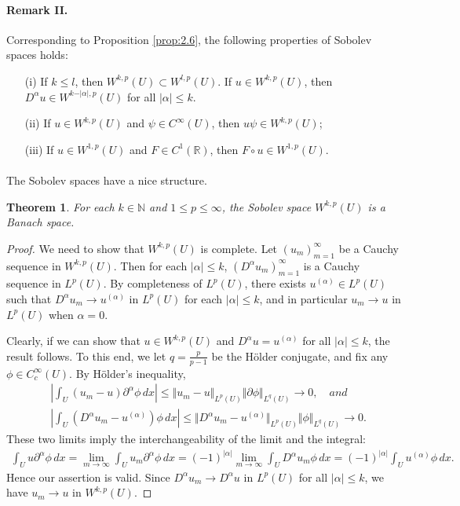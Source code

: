 \documentclass{article}
\numberwithin{equation}{section}
\newcommand{\bbN}{\mathbb{N}}
\newcommand{\bbR}{\mathbb{R}}
\theoremstyle{plain}
\newtheorem{theorem}{Theorem}[section]
\theoremstyle{definition}
\begin{document}
\paragraph{Remark II.} Corresponding to Proposition \ref{prop:2.6}, the following properties of Sobolev spaces holds:
\begin{itemize}
	\item[(i)] If $k\leq l$, then $W^{k,p}(U)\subset W^{l,p}(U)$. If $u\in W^{k,p}(U)$, then $D^\alpha u\in W^{k-\vert\alpha\vert,p}(U)$ for all $\vert\alpha\vert\leq k$.
	\item[(ii)] If $u\in W^{k,p}(U)$ and $\psi\in C^\infty(U)$, then $u\psi\in W^{k,p}(U)$;
	\item[(iii)] If $u\in W^{1,p}(U)$ and $F\in C^1(\bbR)$, then $F\circ u\in W^{1,p}(U)$.
\end{itemize}

\paragraph{} The Sobolev spaces have a nice structure.

\begin{theorem}
For each $k\in\bbN$ and $1\leq p\leq\infty$, the Sobolev space $W^{k,p}(U)$ is a Banach space.
\end{theorem}
\begin{proof}
We need to show that $W^{k,p}(U)$ is complete. Let $(u_m)_{m=1}^\infty$ be a Cauchy sequence in $W^{k,p}(U)$. Then for each $\vert\alpha\vert\leq k$, $(D^\alpha u_m)_{m=1}^\infty$ is a Cauchy sequence in $L^p(U)$. By completeness of $L^p(U)$, there exists $u^{(\alpha)}\in L^p(U)$ such that $D^\alpha u_m\to u^{(\alpha)}$ in $L^p(U)$ for each $\vert\alpha\vert\leq k$, and in particular $u_m\to u$ in $L^p(U)$ when $\alpha=0$.

Clearly, if we can show that $u\in W^{k,p}(U)$ and $D^\alpha u=u^{(\alpha)}$ for all $\vert\alpha\vert\leq k$, the result follows. To this end, we let $q=\frac{p}{p-1}$ be the Hölder conjugate, and fix any $\phi\in C_c^\infty(U)$. By Hölder's inequality,
\begin{align}
	&\left\vert\int_U (u_m-u)\partial^\alpha\phi\,dx\right\vert\leq\Vert u_m-u\Vert_{L^p(U)}\Vert\partial\phi\Vert_{L^q(U)}\to 0,\quad and\\
	&\left\vert\int_U (D^\alpha u_m-u^{(\alpha)})\phi\,dx\right\vert\leq\Vert D^\alpha u_m-u^{(\alpha)}\Vert_{L^p(U)}\Vert\phi\Vert_{L^q(U)}\to 0.\label{convinterwd}
\end{align} 
These two limits imply the interchangeability of the limit and the integral:
\begin{align*}
	\int_U u\partial^\alpha\phi\,dx=\lim_{m\to\infty}\int_U u_m\partial^\alpha\phi\,dx=(-1)^{\vert\alpha\vert}\lim_{m\to\infty}\int_U D^\alpha u_m\phi\,dx=(-1)^{\vert\alpha\vert}\int_U u^{(\alpha)}\phi\,dx.
\end{align*}
Hence our assertion is valid. Since $D^\alpha u_m\to D^\alpha u$ in $L^p(U)$ for all $\vert\alpha\vert\leq k$, we have $u_m\to u$ in $W^{k,p}(U)$.
\end{proof}
\end{document}
